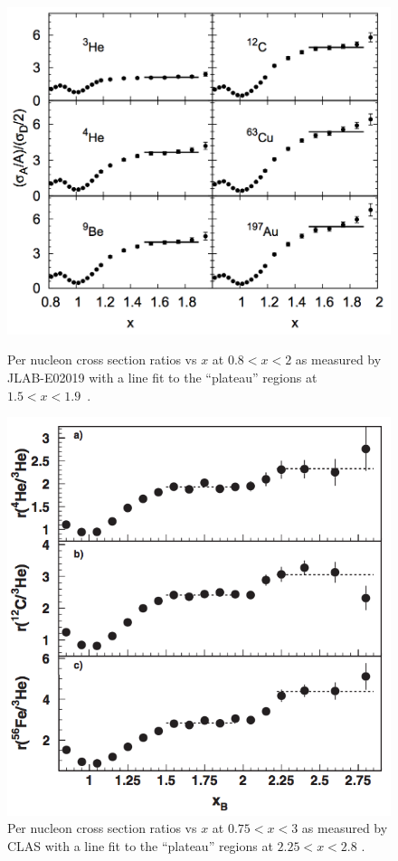 \begin{figure}[!tbp]
	\centering
	\begin{minipage}[b]{.4\textwidth}
		\centering
		\includegraphics[height=0.3\textheight]{figures/background/nn-src-plateau.png}
		\caption{Per nucleon cross section ratios vs $x$ at $0.8<x<2$ as measured by JLAB-E02019 with a line fit to the ``plateau'' regions at $1.5<x<1.9$~\cite{Fomin:2011ng}.}
		\label{fig:nn-src-plateau}
	\end{minipage}%
	\hfill
	\begin{minipage}[b]{.4\textwidth}
		\centering
		\includegraphics[height=0.3\textheight]{figures/background/CLAS-nnn-src-ratio.png}
		\caption{Per nucleon cross section ratios vs $x$ at $0.75<x<3$ as measured by CLAS with a line fit to the ``plateau'' regions  at $2.25<x<2.8$ \cite{PhysRevLett.96.082501}.}
		\label{fig:nnn-src-plateau}
	\end{minipage}
\end{figure}

